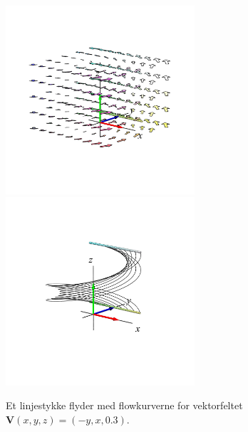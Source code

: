 \begin{figure}[h]
\centerline{\includegraphics[height=70mm]{FIGS/plotVFkurveflow1}\includegraphics[height=70mm]{FIGS/plotVFkurveflow2}}
\begin{center}
\caption{\small{Et linjestykke flyder med flowkurverne for vektorfeltet $\mathbf{V}(x,y,z)= (-y, x, 0.3)$.}}
\label{figVFKurveFlow}
\end{center}
\end{figure}


